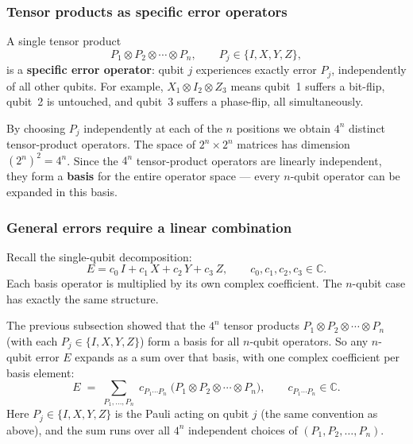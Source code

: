 \documentclass[11pt, a4paper]{article}
\theoremstyle{definition}
\theoremstyle{plain}
\theoremstyle{remark}
\begin{document}
\subsubsection{Tensor products as specific error operators}

A single tensor product
\[
  P_1 \otimes P_2 \otimes \cdots \otimes P_n,
  \qquad P_j \in \{I, X, Y, Z\},
\]
is a \textbf{specific error operator}: qubit $j$ experiences exactly error
$P_j$, independently of all other qubits.  For example,
$X_1 \otimes I_2 \otimes Z_3$ means qubit~1 suffers a bit-flip, qubit~2
is untouched, and qubit~3 suffers a phase-flip, all simultaneously.

By choosing $P_j$ independently at each of the $n$ positions we obtain
$4^n$ distinct tensor-product operators.  The space of $2^n\times2^n$
matrices has dimension $(2^n)^2 = 4^n$.  Since the $4^n$ tensor-product
operators are linearly independent, they form a \textbf{basis} for the
entire operator space --- every $n$-qubit operator can be expanded in this
basis.

\subsubsection{General errors require a linear combination}

Recall the single-qubit decomposition:
\[
  E = c_0\, I + c_1\, X + c_2\, Y + c_3\, Z, \qquad c_0,c_1,c_2,c_3 \in \mathbb{C}.
\]
Each basis operator is multiplied by its own complex coefficient.
The $n$-qubit case has exactly the same structure.

The previous subsection showed that the $4^n$ tensor products
$P_1 \otimes P_2 \otimes \cdots \otimes P_n$ (with each $P_j \in \{I,X,Y,Z\}$)
form a basis for all $n$-qubit operators.
So any $n$-qubit error $E$ expands as a sum over that basis, with one
complex coefficient per basis element:
\[
  E \;=\;
  \sum_{P_1,\ldots,P_n}\;
  c_{P_1 \cdots P_n}\;
  \bigl(P_1 \otimes P_2 \otimes \cdots \otimes P_n\bigr),
  \qquad c_{P_1\cdots P_n} \in \mathbb{C}.
\]
Here $P_j \in \{I,X,Y,Z\}$ is the Pauli acting on qubit $j$ (the
same convention as above), and the sum runs over all $4^n$ independent
choices of $(P_1, P_2, \ldots, P_n)$.
\end{document}
